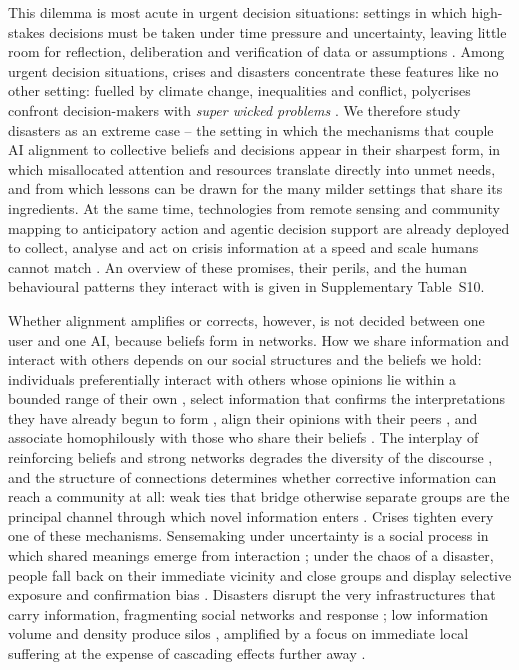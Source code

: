 \documentclass[pdflatex,sn-nature]{sn-jnl}
\begin{document}
This dilemma is most acute in urgent decision situations: settings in which high-stakes decisions must be taken under time pressure and uncertainty, leaving little room for reflection, deliberation and verification of data or assumptions \citep{svenson1993time,mendonca2001decision,comes2020coordination}. Among urgent decision situations, crises and disasters concentrate these features like no other setting: fuelled by climate change, inequalities and conflict, polycrises confront decision-makers with \emph{super wicked problems} \citep{levin2012overcoming,sogaard2024evolution}. We therefore study disasters as an extreme case -- the setting in which the mechanisms that couple AI alignment to collective beliefs and decisions appear in their sharpest form, in which misallocated attention and resources translate directly into unmet needs, and from which lessons can be drawn for the many milder settings that share its ingredients. At the same time, technologies from remote sensing and community mapping to anticipatory action and agentic decision support are already deployed to collect, analyse and act on crisis information at a speed and scale humans cannot match \citep{qadir2016crisis,voigt2007satellite,champlin2023measuring,thalheimer2022role,reichstein2025early,acharya2025agentic}. An overview of these promises, their perils, and the human behavioural patterns they interact with is given in Supplementary Table~S10.

Whether alignment amplifies or corrects, however, is not decided between one user and one AI, because beliefs form in networks. How we share information and interact with others depends on our social structures and the beliefs we hold: individuals preferentially interact with others whose opinions lie within a bounded range of their own \citep{hegselmann2002opinion}, select information that confirms the interpretations they have already begun to form \citep{paulus2022influence}, align their opinions with their peers \citep{friedkin1999social}, and associate homophilously with those who share their beliefs \citep{mcpherson2001birds}. The interplay of reinforcing beliefs and strong networks degrades the diversity of the discourse \citep{Gillani2018}, and the structure of connections determines whether corrective information can reach a community at all: weak ties that bridge otherwise separate groups are the principal channel through which novel information enters \citep{granovetter1973strength}. Crises tighten every one of these mechanisms. Sensemaking under uncertainty is a social process in which shared meanings emerge from interaction \citep{weick2005organizing,maitlis2010sensemaking,klein2010rapid,comes2026sensemaking}; under the chaos of a disaster, people fall back on their immediate vicinity and close groups \citep{comes2020coordination} and display selective exposure \citep{barbera2015tweeting} and confirmation bias \citep{paulus2024interplay}. Disasters disrupt the very infrastructures that carry information, fragmenting social networks and response \citep{holguin2012unique}; low information volume and density produce silos \citep{pan2012crisis}, amplified by a focus on immediate local suffering at the expense of cascading effects further away \citep{sigala2022mitigating,wolbers2018introducing}.
\end{document}
